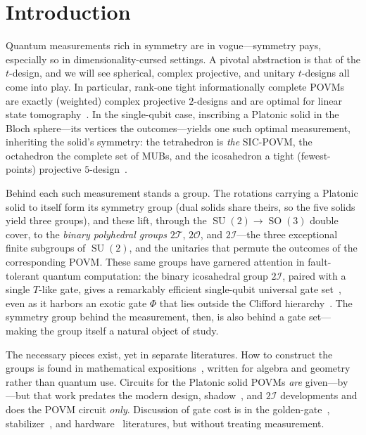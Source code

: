 \documentclass[11pt, oneside, openany]{scrbook}
\DeclareMathOperator{\SU}{SU}
\DeclareMathOperator{\SO}{SO}
\newcommand{\Tgroup}{\mathcal{T}}  %
\newcommand{\Ogroup}{\mathcal{O}}  %
\newcommand{\Igroup}{\mathcal{I}}  %
\newcommand{\TwoT}{2\Tgroup}
\newcommand{\TwoO}{2\Ogroup}
\newcommand{\TwoI}{2\Igroup}
\begin{document}
\clearpage

\tableofcontents %

\mainmatter

\chapter{Introduction}

Quantum measurements rich in symmetry are in vogue---symmetry pays, especially so in dimensionality-cursed settings. A pivotal abstraction is that of the $t$-design, and we will see spherical, complex projective, and unitary $t$-designs all come into play. In particular, rank-one tight informationally complete POVMs are exactly (weighted) complex projective $2$-designs and are optimal for linear state tomography~\cite{scott2006tightinformationallycomplete}. In the single-qubit case, inscribing a Platonic solid in the Bloch sphere---its vertices the outcomes---yields one such optimal measurement, inheriting the solid's symmetry: the tetrahedron is \textit{the} SIC-POVM, the octahedron the complete set of MUBs, and the icosahedron a tight (fewest-points) projective $5$-design~\cite{lyubich2007tightprojectivedesigns,nasmith2023tight}.

Behind each such measurement stands a group. The rotations carrying a Platonic solid to itself form its symmetry group (dual solids share theirs, so the five solids yield three groups), and these lift, through the $\SU(2)\to\SO(3)$ double cover, to the \textit{binary polyhedral groups} $\TwoT$, $\TwoO$, and $\TwoI$---the three exceptional finite subgroups of $\SU(2)$, and the unitaries that permute the outcomes of the corresponding POVM. These same groups have garnered attention in fault-tolerant quantum computation: the binary icosahedral group $\TwoI$, paired with a single $T$-like gate, gives a remarkably efficient single-qubit universal gate set~\cite{parzanchevski2018supergoldengatespu2,blackman2022fastnavigationicosahedral}, even as it harbors an exotic gate $\Phi$ that lies outside the Clifford hierarchy~\cite{kubischta2023familyquantumcodes}. The symmetry group behind the measurement, then, is also behind a gate set---making the group itself a natural object of study.

The necessary pieces exist, yet in separate literatures. How to construct the groups is found in mathematical expositions~\cite{conway2009quaternionsoctonionstheir,coxeter1973regularpolytopes,vanhoboken2002platonicsolidsbinary}, written for algebra and geometry rather than quantum use. Circuits for the Platonic solid POVMs \textit{are} given---by \textcite{decker2004quantumcircuitssinglequbit}---but that work predates the modern design, shadow~\cite{huang2020predictingmanyproperties}, and $\TwoI$ developments and does the POVM circuit \textit{only}. Discussion of gate cost is in the golden-gate~\cite{parzanchevski2018supergoldengatespu2,blackman2022fastnavigationicosahedral}, stabilizer~\cite{bravyi2019simulationquantumcircuits}, and hardware~\cite{barends2014rollingquantumdice} literatures, but without treating measurement.
\end{document}
